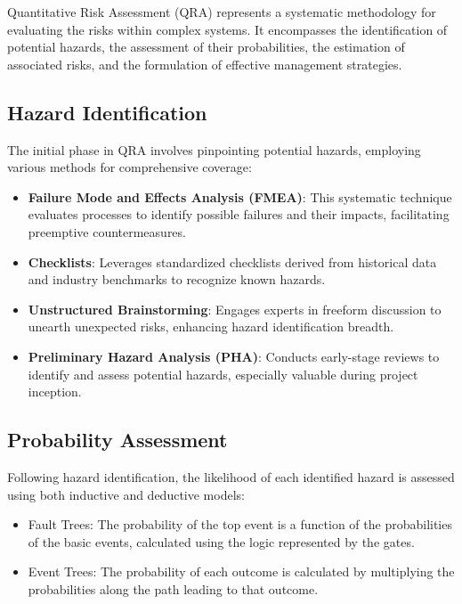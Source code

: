 

Quantitative Risk Assessment (QRA) represents a systematic methodology for evaluating the risks within complex systems. It encompasses the identification of potential hazards, the assessment of their probabilities, the estimation of associated risks, and the formulation of effective management strategies.

\subsection*{Hazard Identification}
The initial phase in QRA involves pinpointing potential hazards, employing various methods for comprehensive coverage:

\begin{itemize}
    \item \textbf{Failure Mode and Effects Analysis (FMEA)}: This systematic technique evaluates processes to identify possible failures and their impacts, facilitating preemptive countermeasures.
    \item \textbf{Checklists}: Leverages standardized checklists derived from historical data and industry benchmarks to recognize known hazards.
    \item \textbf{Unstructured Brainstorming}: Engages experts in freeform discussion to unearth unexpected risks, enhancing hazard identification breadth.
    \item \textbf{Preliminary Hazard Analysis (PHA)}: Conducts early-stage reviews to identify and assess potential hazards, especially valuable during project inception.
\end{itemize}

\subsection*{Probability Assessment}
Following hazard identification, the likelihood of each identified hazard is assessed using both inductive and deductive models:

\begin{itemize}
    \item Fault Trees: The probability of the top event is a function of the probabilities of the basic events, calculated using the logic represented by the gates.
    \item Event Trees: The probability of each outcome is calculated by multiplying the probabilities along the path leading to that outcome.
\end{itemize}

